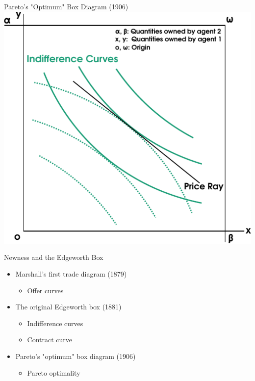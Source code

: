 \documentclass[ucs]{beamer}\usepackage[]{graphicx}\usepackage[]{color}
\begin{document}
\begin{frame}{Pareto's "Optimum" Box Diagram (1906)}
\includegraphics[scale = 0.9]{Pareto.pdf}
\end{frame}

\begin{frame}{Newness and the Edgeworth Box}
\begin{itemize}
\item Marshall's first trade diagram (1879)
	\begin{itemize}
		\item Offer curves
	\end{itemize}
\item The original Edgeworth box (1881) 
	\begin{itemize}
		\item Indifference curves
		\item Contract curve
	\end{itemize}
\item Pareto's "optimum" box diagram (1906)
	\begin{itemize}
		\item Pareto optimality
	\end{itemize}
\end{itemize}
\end{frame}
\end{document}
